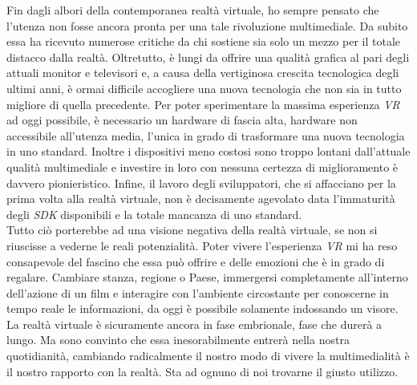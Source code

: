Fin dagli albori della contemporanea realtà virtuale, ho sempre pensato che l'utenza non fosse ancora pronta per una tale rivoluzione multimediale. Da subito essa ha ricevuto numerose critiche da chi sostiene sia solo un mezzo per il totale distacco dalla realtà. Oltretutto, è lungi da offrire una qualità grafica al pari degli attuali monitor e televisori e, a causa della vertiginosa crescita tecnologica degli ultimi anni, è ormai difficile accogliere una nuova tecnologia che non sia in tutto migliore di quella precedente. Per poter sperimentare la massima esperienza \textit{VR} ad oggi possibile, è necessario un hardware di fascia alta, hardware non accessibile all'utenza media, l'unica in grado di trasformare una nuova tecnologia in uno standard. Inoltre i dispositivi meno costosi sono troppo lontani dall'attuale qualità multimediale e investire in loro con nessuna certezza di miglioramento è davvero pionieristico. Infine, il lavoro degli sviluppatori, che si affacciano per la prima volta alla realtà virtuale, non è decisamente agevolato data l'immaturità degli \textit{SDK} disponibili e la totale mancanza di uno standard. \\ 
Tutto ciò porterebbe ad una visione negativa della realtà virtuale, se non si riuscisse a vederne le reali potenzialità. Poter vivere l'esperienza \textit{VR} mi ha reso consapevole del fascino che essa può offrire e delle emozioni che è in grado di regalare. Cambiare stanza, regione o Paese, immergersi completamente all'interno dell'azione di un film e interagire con l'ambiente circostante per conoscerne in tempo reale le informazioni, da oggi è possibile solamente indossando un visore. \\
La realtà virtuale è sicuramente ancora in fase embrionale, fase che durerà a lungo. Ma sono convinto che essa inesorabilmente entrerà nella nostra quotidianità, cambiando radicalmente il nostro modo di vivere la multimedialità è il nostro rapporto con la realtà. Sta ad ognuno di noi trovarne il giusto utilizzo.  